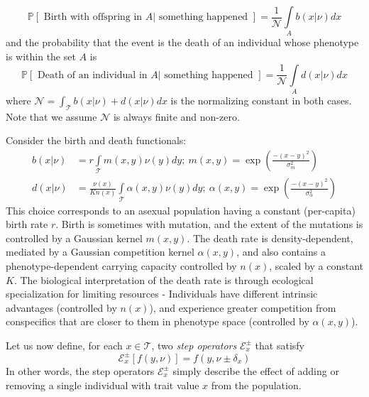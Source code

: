 \begin{equation*}
    \mathbb{P}[\textrm{ Birth with offspring in }A | \textrm{ something happened }] = \frac{1}{\mathcal{N}}\int\limits_{A}b(x|\nu)dx
\end{equation*}
and the probability that the event is the death of an individual whose phenotype is within the set $A$ is
\begin{equation*}
    \mathbb{P}[\textrm{ Death of an individual in }A | \textrm{ something happened }] = \frac{1}{\mathcal{N}}\int\limits_{A}d(x|\nu)dx
\end{equation*}
where $\mathcal{N} = \int_{\mathcal{T}}b(x|\nu)+d(x|\nu)dx$ is the normalizing constant in both cases. Note that we assume $\mathcal{N}$ is always finite and non-zero.

\begin{example}
Consider the birth and death functionals:
\begin{equation}
\label{Rogers_logistic_BD}
\begin{aligned}
b(x|\nu) &= r\int\limits_{\mathcal{T}}m(x,y)\nu(y)dy; \ m(x,y) = \exp\left(\frac{-(x-y)^2}{\sigma_{m}^{2}}\right)\\
    d(x|\nu) &= \frac{\nu(x)}{Kn(x)}\int\limits_{\mathcal{T}}\alpha(x,y)\nu(y)dy; \ \alpha(x,y) = \exp\left(\frac{-(x-y)^2}{\sigma_{\alpha}^{2}}\right)
\end{aligned}
\end{equation}
This choice corresponds to an asexual population having a constant (per-capita) birth rate $r$. Birth is sometimes with mutation, and the extent of the mutations is controlled by a Gaussian kernel $m(x,y)$. The death rate is density-dependent, mediated by a Gaussian competition kernel $\alpha(x,y)$, and also contains a phenotype-dependent carrying capacity controlled by $n(x)$, scaled by a constant $K$. The biological interpretation of the death rate is through ecological specialization for limiting resources - Individuals have different intrinsic advantages (controlled by $n(x)$), and experience greater competition from conspecifics that are closer to them in phenotype space (controlled by $\alpha(x,y)$).
\end{example}
Let us now define, for each $x \in \mathcal{T}$, two \emph{step operators} $\mathcal{E}_{x}^{\pm}$ that satisfy
\begin{equation*}
    \mathcal{E}_{x}^{\pm}[f(y,\nu)] =  f(y,\nu \pm \delta_x)
\end{equation*}
In other words, the step operators $\mathcal{E}_{x}^{\pm}$ simply describe the effect of adding or removing a single individual with trait value $x$ from the population.

